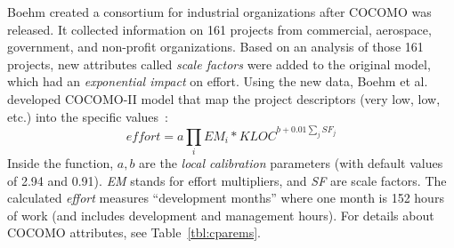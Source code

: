 \documentclass[sigconf,review]{acmart}
\newcommand{\tbl}[1]{Table~\ref{tbl:#1}}
\newcommand{\fig}[1]{Figure~\ref{fig:#1}}
\begin{document}
  
    
    


Boehm created a consortium for
industrial organizations after COCOMO was released.
It collected information on 161 projects from commercial,
aerospace, government, and non-profit organizations.
Based on an analysis of those 161 projects, new attributes called {\em scale factors} were added to the original model, which had an {\em exponential impact}
on effort.
Using the new data, Boehm et al. developed COCOMO-II model that map the project descriptors (very low, low, etc.)
into the specific values~\cite{boehm2000cost}:
\[
\mathit{effort}=a\prod_i EM_i *\mathit{KLOC}^{b+0.01\sum_j SF_j}
\]
Inside the function, $a,b$ are the {\em local calibration} parameters (with default values of 2.94 and 0.91). {\em EM} stands for effort multipliers, and {\em SF} are scale factors. The calculated {\em effort}
measures ``development months'' where one month is 152 hours of work  (and includes development and management hours). For details about COCOMO attributes, see \tbl{cparems}.
\end{document}
